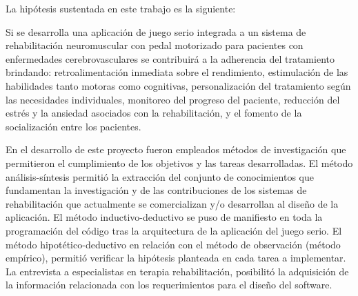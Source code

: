 \begin{introduction}
    La hipótesis sustentada en este trabajo es la siguiente:

    Si se desarrolla una aplicación de juego serio integrada a un sistema de rehabilitación neuromuscular con pedal motorizado para pacientes con enfermedades cerebrovasculares se contribuirá a la adherencia del tratamiento brindando: retroalimentación inmediata sobre el rendimiento, estimulación de las habilidades tanto motoras como cognitivas, personalización del tratamiento según las necesidades individuales, monitoreo del progreso del paciente, reducción del estrés y la ansiedad asociados con la rehabilitación, y el fomento de la socialización entre los pacientes.

    En el desarrollo de este proyecto fueron empleados métodos de investigación que permitieron el cumplimiento de los objetivos y las tareas desarrolladas. El método análisis-síntesis permitió la extracción del conjunto de conocimientos que fundamentan la investigación y de las contribuciones de los sistemas de rehabilitación que actualmente se comercializan y/o desarrollan al diseño de la aplicación. El método inductivo-deductivo se puso de manifiesto en toda la programación del código tras la arquitectura de la aplicación del juego serio. El método hipotético-deductivo en relación con el método de observación (método empírico), permitió verificar la hipótesis planteada en cada tarea a implementar. La entrevista a especialistas en terapia rehabilitación, posibilitó la adquisición de la información relacionada con los requerimientos para el diseño del software.
\end{introduction}